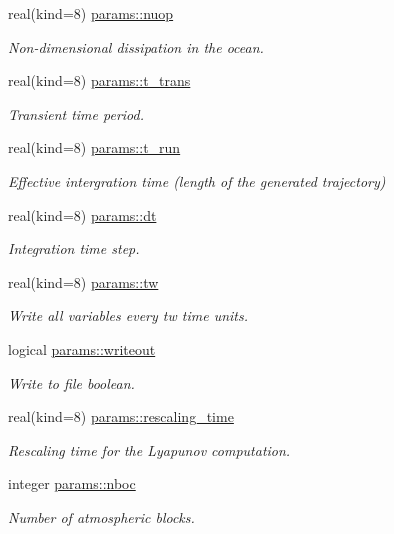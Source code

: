\begin{DoxyCompactItemize}
real(kind=8) \hyperlink{namespaceparams_a4802663c55680d2c51142f63636abd2e}{params\+::nuop}
\begin{DoxyCompactList}\small\item\em Non-\/dimensional dissipation in the ocean. \end{DoxyCompactList}\item 
real(kind=8) \hyperlink{namespaceparams_aabf0943afa2272a8bbbd58c49ad0db38}{params\+::t\+\_\+trans}
\begin{DoxyCompactList}\small\item\em Transient time period. \end{DoxyCompactList}\item 
real(kind=8) \hyperlink{namespaceparams_a923cab407956c82921069b7ec0e69eb9}{params\+::t\+\_\+run}
\begin{DoxyCompactList}\small\item\em Effective intergration time (length of the generated trajectory) \end{DoxyCompactList}\item 
real(kind=8) \hyperlink{namespaceparams_a2d658dc74d6a45a2e71b06bde97df084}{params\+::dt}
\begin{DoxyCompactList}\small\item\em Integration time step. \end{DoxyCompactList}\item 
real(kind=8) \hyperlink{namespaceparams_a0955c0296092bb15d2dcd120d72ad479}{params\+::tw}
\begin{DoxyCompactList}\small\item\em Write all variables every tw time units. \end{DoxyCompactList}\item 
logical \hyperlink{namespaceparams_affc7b423a975c0e92b62e67ed04edea5}{params\+::writeout}
\begin{DoxyCompactList}\small\item\em Write to file boolean. \end{DoxyCompactList}\item 
real(kind=8) \hyperlink{namespaceparams_a9abc30794d97348ca8f129e052f50630}{params\+::rescaling\+\_\+time}
\begin{DoxyCompactList}\small\item\em Rescaling time for the Lyapunov computation. \end{DoxyCompactList}\item 
integer \hyperlink{namespaceparams_a54123b5a947703d21d0c882dec6780ac}{params\+::nboc}
\begin{DoxyCompactList}\small\item\em Number of atmospheric blocks. \end{DoxyCompactList}\item 

\end{DoxyCompactItemize}
